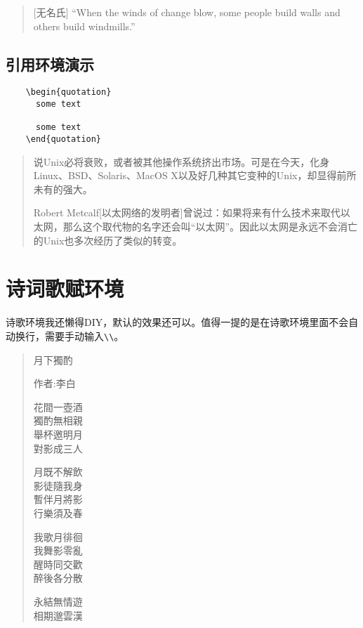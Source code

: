 \documentclass[11pt,oneside]{book}
\begin{document}
  \begin{quote}[无名氏]
    “When the winds of change blow, some people build walls and others build windmills.”
  \end{quote}

  \subsection{引用环境演示}
  \begin{Verbatim}
    \begin{quotation}
      some text

      some text
    \end{quotation}
  \end{Verbatim}


  \begin{quotation}
    说Unix必将衰败，或者被其他操作系统挤出市场。可是在今天，化身Linux、BSD、Solaris、MacOS X以及好几种其它变种的Unix，却显得前所未有的强大。

    Robert Metcalf[以太网络的发明者]曾说过：如果将来有什么技术来取代以太网，那么这个取代物的名字还会叫“以太网”。因此以太网是永远不会消亡的Unix也多次经历了类似的转变。
  \end{quotation}



  \section{诗词歌赋环境}
  诗歌环境我还懒得DIY，默认的效果还可以。值得一提的是在诗歌环境里面不会自动换行，需要手动输入\verb+\\+。

  \begin{verse}
    \centering\noindent
    月下獨酌

    作者:李白

    花間一壺酒\\
    獨酌無相親\\
    舉杯邀明月\\
    對影成三人

    月既不解飲\\
    影徒隨我身\\
    暫伴月將影\\
    行樂須及春

    我歌月徘徊\\
    我舞影零亂\\
    醒時同交歡\\
    醉後各分散

    永結無情遊\\
    相期邈雲漢
  \end{verse}
\end{document}
